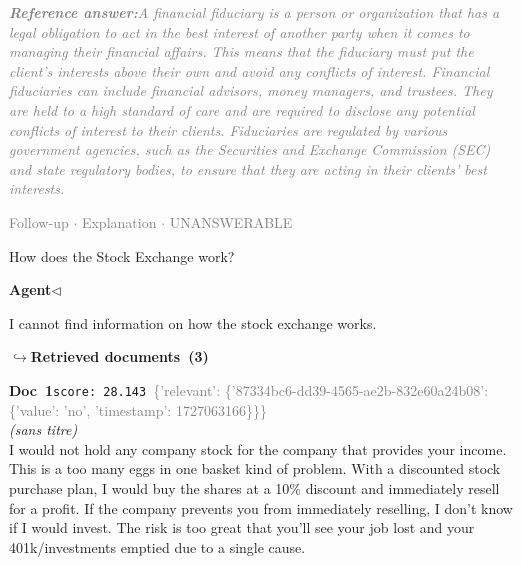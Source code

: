 \documentclass[a4paper,11pt]{article}
\begin{document}
\begin{refanswerenv}
{\footnotesize\textit{\textcolor{gray}{\textbf{Reference answer:}\enspace A financial fiduciary is a person or organization that has a legal obligation to act in the best interest of another party when it comes to managing their financial affairs. This means that the fiduciary must put the client's interests above their own and avoid any conflicts of interest. Financial fiduciaries can include financial advisors, money managers, and trustees. They are held to a high standard of care and are required to disclose any potential conflicts of interest to their clients. Fiduciaries are regulated by various government agencies, such as the Securities and Exchange Commission (SEC) and state regulatory bodies, to ensure that they are acting in their clients' best interests.}}}
\end{refanswerenv}
\vspace{0.5em}
\hfill{\tiny\textcolor{gray}{Follow-up $\cdot$ Explanation $\cdot$ UNANSWERABLE}}
\begin{userbubble}
How does the Stock Exchange work?
\end{userbubble}
\noindent\hfill{\small\textcolor{agentcolor}{\textbf{Agent\enspace$\triangleleft$}}}
\begin{agentbubble}
I cannot find information on how the stock exchange works.
\end{agentbubble}
\noindent\hfill{\footnotesize\textcolor{doccolor}{\textbf{$\hookrightarrow$\enspace Retrieved documents~(3)}}}
\begin{docenv}
{\footnotesize\textcolor{doccolor}{\textbf{Doc~1}}}\hfill{\tiny\texttt{score:~28.143}}\ {\tiny\textcolor{gray}{\{'relevant': \{'87334bc6-dd39-4565-ae2b-832e60a24b08': \{'value': 'no', 'timestamp': 1727063166\}\}\}}}\\[3pt]
{\small\textit{(sans titre)}}\\[2pt]
\vspace{2pt}
{\footnotesize 
I would not hold any company stock for the company that provides your income.   This is a too many eggs in one basket kind of problem. With a discounted stock purchase plan, I would buy the shares at a 10\% discount and immediately resell for a profit.   If the company prevents you from immediately reselling, I  don't know if I would invest. The risk is too great that you'll see your job lost and your 401k/investments emptied due to a single cause.}
\end{docenv}
\end{document}
